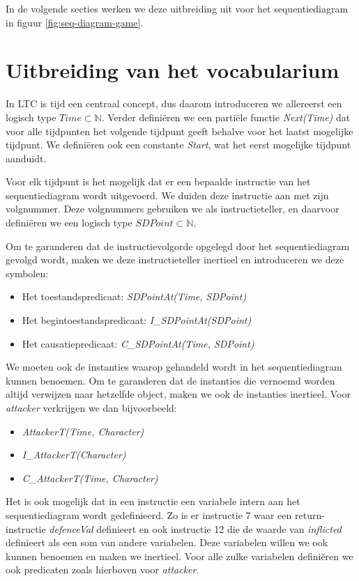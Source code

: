 In de volgende secties werken we deze uitbreiding uit voor het sequentiediagram in figuur \ref{fig:seq-diagram-game}.

\section{Uitbreiding van het vocabularium}
In LTC is tijd een centraal concept, dus daarom introduceren we allereerst een logisch type $Time \subset \mathbb{N}$. Verder defini\"eren we een parti\"ele functie \textit{Next(Time)} dat voor alle tijdpunten het volgende tijdpunt geeft behalve voor het laatst mogelijke tijdpunt. We defini\"eren ook een constante \textit{Start}, wat het eerst mogelijke tijdpunt aanduidt.

Voor elk tijdpunt is het mogelijk dat er een bepaalde instructie van het sequentiediagram wordt uitgevoerd. We duiden deze instructie aan met zijn volgnummer.
Deze volgnummers gebruiken we als instructieteller, en daarvoor defini\"eren we een logisch type $SDPoint \subset \mathbb{N}$.

Om te garanderen dat de instructievolgorde opgelegd door het sequentiediagram gevolgd wordt, maken we deze instructieteller inertieel en introduceren we deze symbolen:

\begin{itemize}
	\item Het toestandspredicaat: \textit{SDPointAt(Time, SDPoint)}
	\item Het begintoestandspredicaat: \textit{I\_SDPointAt(SDPoint)}
	\item Het causatiepredicaat: \textit{C\_SDPointAt(Time, SDPoint)}
\end{itemize}

We moeten ook de instanties waarop gehandeld wordt in het sequentiediagram kunnen benoemen. Om te garanderen dat de instanties die vernoemd worden altijd verwijzen naar hetzelfde object, maken we ook de instanties inertieel. Voor \textit{attacker} verkrijgen we dan bijvoorbeeld:

\begin{itemize}
	\item \textit{AttackerT(Time, Character)}
	\item \textit{I\_AttackerT(Character)}
	\item \textit{C\_AttackerT(Time, Character)}
\end{itemize}

Het is ook mogelijk dat in een instructie een variabele intern aan het sequentiediagram wordt gedefinieerd. Zo is er instructie 7 waar een return-instructie \textit{defenceVal} definieert en ook instructie 12 die de waarde van \textit{inflicted} definieert als een som van andere variabelen. Deze variabelen willen we ook kunnen benoemen en maken we inertieel. Voor alle zulke variabelen defini\"eren we ook predicaten zoals hierboven voor \textit{attacker}.

